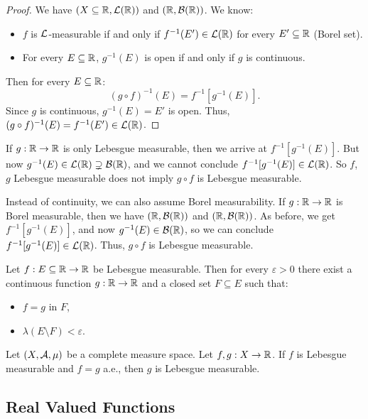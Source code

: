 \begin{proof}
We have $(X \subseteq \mathbb{R}, \mathcal{L}(\mathbb{R}))$ and $(\mathbb{R}, \mathcal{B}(\mathbb{R}))$.
We know:
\begin{itemize}
    \item $f$ is $\mathcal{L}$-measurable if and only if $f^{-1}(E') \in \mathcal{L}(\mathbb{R})$ for every $E' \subseteq \mathbb{R}$ (Borel set).
    \item For every $E \subseteq \mathbb{R}$, $g^{-1}(E)$ is open if and only if $g$ is continuous.
\end{itemize}
Then for every $E \subseteq \mathbb{R}$:
\[
(g \circ f)^{-1}(E) = f^{-1}[g^{-1}(E)].
\]
Since $g$ is continuous, $g^{-1}(E) = E'$ is open.
Thus, $(g \circ f)^{-1}(E) = f^{-1}(E') \in \mathcal{L}(\mathbb{R})$.
\end{proof}

\begin{remark}[1]
If $g:\mathbb{R} \to \mathbb{R}$ is only Lebesgue measurable, then we arrive at $f^{-1}[g^{-1}(E)]$.
But now $g^{-1}(E) \in \mathcal{L}(\mathbb{R}) \supsetneq \mathcal{B}(\mathbb{R})$, and we cannot conclude $f^{-1}[g^{-1}(E)] \in \mathcal{L}(\mathbb{R})$.
So $f$, $g$ Lebesgue measurable does not imply $g \circ f$ is Lebesgue measurable.
\end{remark}

\begin{remark}[2]
Instead of continuity, we can also assume Borel measurability.
If $g:\mathbb{R} \to \mathbb{R}$ is Borel measurable, then we have $(\mathbb{R}, \mathcal{B}(\mathbb{R}))$ and $(\mathbb{R}, \mathcal{B}(\mathbb{R}))$.
As before, we get $f^{-1}[g^{-1}(E)]$, and now $g^{-1}(E) \in \mathcal{B}(\mathbb{R})$, so we can conclude $f^{-1}[g^{-1}(E)] \in \mathcal{L}(\mathbb{R})$.
Thus, $g \circ f$ is Lebesgue measurable.
\end{remark}

\begin{theorem}[Lusin]
Let $f:E \subseteq \mathbb{R} \to \mathbb{R}$ be Lebesgue measurable.
Then for every $\varepsilon > 0$ there exist a continuous function $g:\mathbb{R} \to \mathbb{R}$ and a closed set $F \subseteq E$ such that:
\begin{itemize}
    \item $f = g$ in $F$,
    \item $\lambda(E \setminus F) < \varepsilon$.
\end{itemize}
\end{theorem}

\begin{theorem}
Let $(X,\mathcal{A},\mu)$ be a complete measure space. Let $f,g:X \to \mathbb{R}$.
If $f$ is Lebesgue measurable and $f = g$ a.e., then $g$ is Lebesgue measurable.
\end{theorem}

\clearpage
\subsection{Real Valued Functions}


